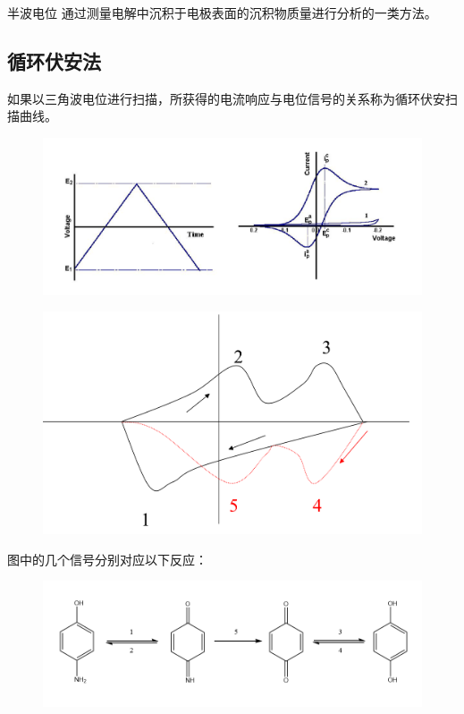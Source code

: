 \begin{definition*}{半波电位}{}
	通过测量电解中沉积于电极表面的沉积物质量进行分析的一类方法。
\end{definition*}


\subsection{循环伏安法}
如果以三角波电位进行扫描，所获得的电流响应与电位信号的关系称为循环伏安扫描曲线。
\begin{figure}
	\centering
	\includegraphics[width=0.7\linewidth]{image/chp7_circular_VA}
	\label{fig:chp7circularva}
\end{figure}

\begin{example}
	\begin{figure}[!h]
		\centering
		\includegraphics[width=0.7\linewidth]{image/chp7_circular_VA_example}
		\caption{}
		\label{fig:chp7circularvaexample}
	\end{figure}
	图中的几个信号分别对应以下反应：
	\begin{figure}[!h]
		\centering
		\includegraphics[width=\linewidth]{image/chp7_circular_VA_example_result}
		\label{fig:chp7circularvaexampleresult}
	\end{figure}
	
\end{example}

